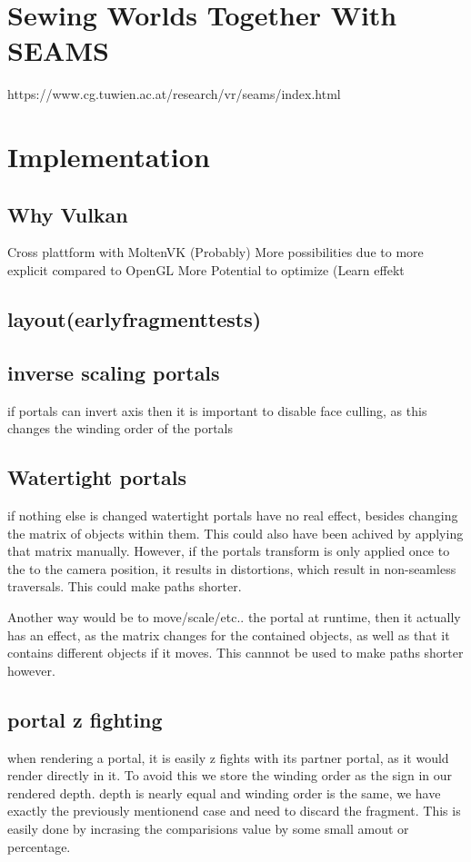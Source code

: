 
\section{Sewing Worlds Together With SEAMS}
https://www.cg.tuwien.ac.at/research/vr/seams/index.html
\section{Implementation}
\subsection{Why Vulkan}
Cross plattform with MoltenVK
(Probably) More possibilities due to more explicit compared to OpenGL
More Potential to optimize
(Learn effekt


\subsection{layout(earlyfragmenttests)}

\subsection{inverse scaling portals}
if portals can invert axis then it is important to disable face culling, as this changes the winding order of the portals

\subsection{Watertight portals}
if nothing else is changed watertight portals have no real effect, besides changing the matrix of objects within them. This could also have been achived by applying that matrix manually.
However, if the portals transform is only applied once to the to the camera position, it results in distortions, which result in non-seamless traversals.
This could make paths shorter.

Another way would be to move/scale/etc.. the portal at runtime, then it actually has an effect, as the matrix changes for the contained objects, as well as that it contains different objects if it moves. This cannnot be used to make paths shorter however.


\subsection{portal z fighting}
when rendering a portal, it is easily z fights with its partner portal, as it would render directly in it. To avoid this we store the winding order as the sign in our rendered depth.  depth is nearly equal and winding order is the same, we have exactly the previously mentionend case and need to discard the fragment. This is easily done by incrasing the comparisions value by some small amout or percentage.


